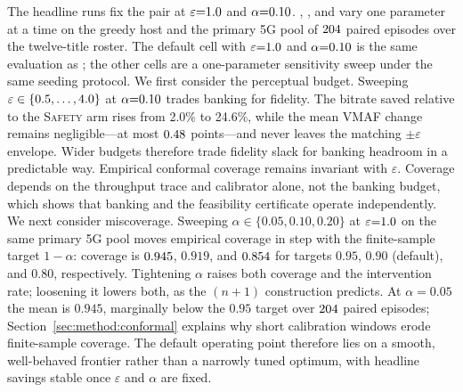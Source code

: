 The headline runs fix the pair at \(\varepsilon{=}\CPSepsilon\) and \(\alpha{=}\CPSalpha\). , , and  vary one parameter at a time on the greedy host and the primary \mbox{5G} pool of \(204\) paired episodes over the twelve-title roster. The default cell with \(\varepsilon{=}\CPSepsilon\) and \(\alpha{=}\CPSalpha\) is the same evaluation as ; the other cells are a one-parameter sensitivity sweep under the same seeding protocol.
We first consider the perceptual budget. Sweeping \(\varepsilon\in\{0.5,\dots,4.0\}\) at \(\alpha{=}\CPSalpha\) trades banking for fidelity.
The bitrate saved relative to the \textsc{Safety} arm rises from 2.0\% to 24.6\%, while the mean VMAF change remains negligible---at most \(0.48\) points---and never leaves the matching \(\pm\varepsilon\) envelope. Wider budgets therefore trade fidelity slack for banking headroom in a predictable way.
Empirical conformal coverage remains invariant with \(\varepsilon\). Coverage depends on the throughput trace and calibrator alone, not the banking budget, which shows that banking and the feasibility certificate operate independently.
We next consider miscoverage. Sweeping \(\alpha\in\{0.05,0.10,0.20\}\) at \(\varepsilon{=}\CPSepsilon\) on the same primary \mbox{5G} pool moves empirical coverage in step with the finite-sample target \(1{-}\alpha\): coverage is \(0.945\), \(0.919\), and \(0.854\) for targets \(0.95\), \(0.90\) (default), and \(0.80\), respectively.
Tightening \(\alpha\) raises both coverage and the intervention rate; loosening it lowers both, as the \((n{+}1)\) construction predicts.
At \(\alpha{=}0.05\) the mean is \(0.945\), marginally below the \(0.95\) target over \(204\) paired episodes; Section~\ref{sec:method:conformal} explains why short calibration windows erode finite-sample coverage. The default operating point therefore lies on a smooth, well-behaved frontier rather than a narrowly tuned optimum, with headline savings stable once \(\varepsilon\) and \(\alpha\) are fixed.

\begin{cps@table}
  \centering
  \caption{Sensitivity to the perceptual budget \(\varepsilon\) (greedy host, \mbox{5G} test, \(\alpha{=}\CPSalpha\), certified vs.\ safety). The \(\varepsilon{=}\CPSepsilon\) row is the headline run of .}
  \label{tab:abl:eps}
  \small
  \evaltable{}
\end{cps@table}

